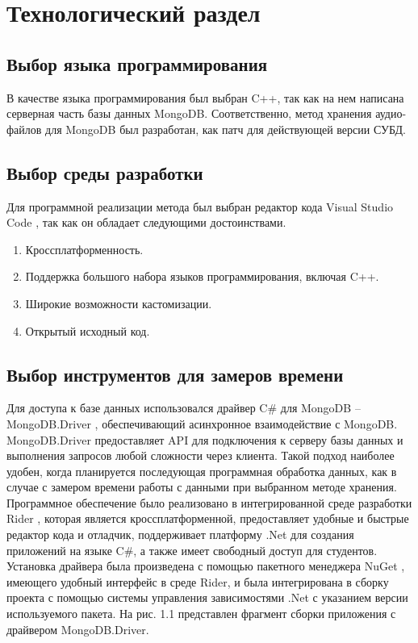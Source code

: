 \chapter{Технологический раздел}


\section{Выбор языка программирования}

В качестве языка программирования был выбран C++, так как на нем написана серверная часть базы данных MongoDB. Соответственно, метод хранения аудио-файлов для MongoDB был разработан, как патч для действующей версии СУБД.

\section{Выбор среды разработки}

Для программной реализации метода был выбран редактор кода Visual Studio Code \cite{VSC}, так как он обладает следующими достоинствами.
\begin{enumerate}
\item Кроссплатформенность.
\item Поддержка большого набора языков программирования, включая C++.
\item Широкие возможности кастомизации.
\item Открытый исходный код.
\end{enumerate}

\section{Выбор инструментов для замеров времени}

Для доступа к базе данных использовался драйвер C\# для MongoDB -- MongoDB.Driver \cite{CSDriver}, обеспечивающий асинхронное взаимодействие с MongoDB. MongoDB.Driver предоставляет API для подключения к серверу базы данных и выполнения запросов любой сложности через клиента. Такой подход наиболее удобен, когда планируется последующая программная обработка данных, как в случае с замером времени работы с данными при выбранном методе хранения.
Программное обеспечение было реализовано в интегрированной среде разработки Rider \cite{Rider}, которая является кроссплатформенной, предоставляет удобные и быстрые редактор кода и отладчик, поддерживает платформу .Net \cite{Net} для создания приложений на языке C\#, а также имеет свободный доступ для студентов. Установка драйвера была произведена с помощью пакетного менеджера NuGet \cite{NuGet}, имеющего удобный интерфейс в среде Rider, и была интегрирована в сборку проекта с помощью системы управления зависимостями .Net с указанием версии используемого пакета. На рис. 1.1 представлен фрагмент сборки приложения с драйвером MongoDB.Driver.

